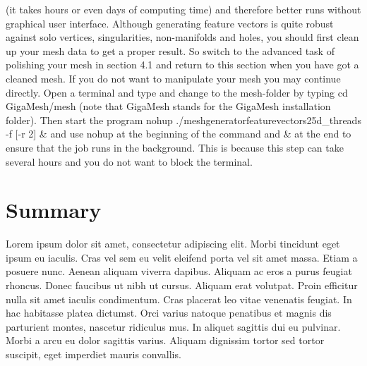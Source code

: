 (it takes hours or even days of computing time) and therefore better runs 
without graphical user interface. Although generating feature vectors is quite 
robust against solo vertices, singularities, non-manifolds and holes, you should 
first clean up your mesh data to get a proper result. So switch to the advanced 
task of polishing your mesh in section 4.1 and return to this section when you 
have got a cleaned mesh. If you do not want to manipulate your mesh you may 
continue directly. Open a terminal and type and change to the mesh-folder by 
typing cd GigaMesh/mesh (note that GigaMesh stands for the GigaMesh installation 
folder). Then start the program nohup ./meshgeneratorfeaturevectors25d\_threads 
-f [-r 2] \& and use nohup at the beginning of the command and \& at the end to 
ensure that the job runs in the background. This is because this step can take 
several hours and you do not want to block the terminal.~\cite[p.~19]{Giga17}



\section{Summary}
Lorem ipsum dolor sit amet, consectetur adipiscing elit. Morbi tincidunt eget 
ipsum eu iaculis. Cras vel sem eu velit eleifend porta vel sit amet massa. Etiam 
a posuere nunc. Aenean aliquam viverra dapibus. Aliquam ac eros a purus feugiat 
rhoncus. Donec faucibus ut nibh ut cursus. Aliquam erat volutpat. Proin efficitur 
nulla sit amet iaculis condimentum. Cras placerat leo vitae venenatis feugiat. In 
hac habitasse platea dictumst. Orci varius natoque penatibus et magnis dis 
parturient montes, nascetur ridiculus mus. In aliquet sagittis dui eu pulvinar. 
Morbi a arcu eu dolor sagittis varius. Aliquam dignissim tortor sed tortor 
suscipit, eget imperdiet mauris convallis.
